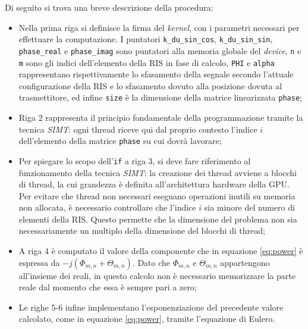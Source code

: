 

Di seguito si trova una breve descrizione della procedura:

\begin{itemize}
  \item Nella prima riga si definisce la firma del \textit{kernel}, con i parametri
    necessari per effettuare la computazione. I puntatori \texttt{k\_du\_sin\_cos},
    \texttt{k\_du\_sin\_sin}, \texttt{phase\_real} e \texttt{phase\_imag} sono
    puntatori alla memoria globale del \textit{device}, \texttt{n} e \texttt{m}
    sono gli indici dell'elemento della RIS in fase di calcolo, \texttt{PHI} e
    \texttt{alpha} rappresentano rispettivamente lo sfasamento della segnale secondo
    l'attuale configurazione della RIS e lo sfasamento dovuto alla posizione dovuta
    al trasmettitore, ed infine \texttt{size} è la dimensione della matrice linearizzata
    \texttt{phase};

  \item Riga 2 rappresenta il principio fondamentale della programmazione tramite
    la tecnica \textit{SIMT}: ogni thread riceve qui dal proprio contesto l'indice
    $i$ dell'elemento della matrice \texttt{phase} su cui dovrà lavorare;

  \item Per spiegare lo scopo dell'\texttt{if} a riga 3, si deve fare riferimento
    al funzionamento della tecnica \textit{SIMT}: la creazione dei thread avviene
    a blocchi di thread, la cui grandezza è definita all'architettura hardware
    della GPU. Per evitare che thread non necessari eseguano operazioni inutili su
    memoria non allocata, è necessario controllare che l'indice $i$ sia minore
    del numero di elementi della RIS. Questo permette che la dimensione del problema
    non sia necessariamente un multiplo della dimensione del blocchi di thread;

  \item A riga 4 è computato il valore della componente che in equazione \ref{eq:power}
    è espressa da $-j(\Phi_{m,n}+\Theta_{m,n})$. Dato che $\Phi_{m,n}$ e
    $\Theta_{m,n}$ appartengono all'insieme dei reali, in questo calcolo non è necessario
    memorizzare la parte reale dal momento che essa è sempre pari a zero;

  \item Le righe 5-6 infine implementano l'esponenziazione del precedente valore
    calcolato, come in equazione \ref{eq:power}, tramite l'equazione di Eulero.
\end{itemize}

